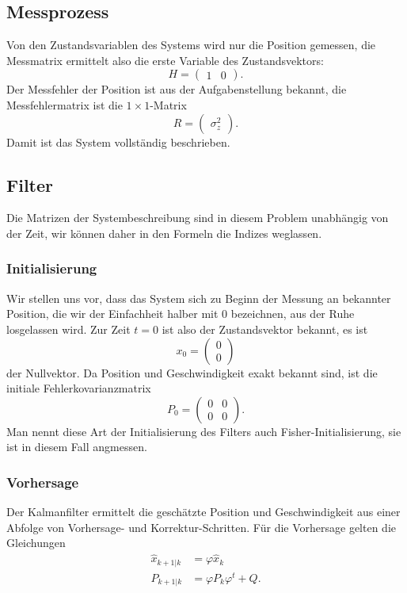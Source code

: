 \subsection{Messprozess}
Von den Zustandsvariablen des Systems wird nur die Position gemessen,
die Messmatrix ermittelt also die erste Variable des Zustandsvektors:
\[
H=\begin{pmatrix}1&0\end{pmatrix}.
\]
Der Messfehler der Position ist aus der Aufgabenstellung bekannt, die
Messfehlermatrix ist die $1\times 1$-Matrix
\[
R=\begin{pmatrix}
\sigma_z^2
\end{pmatrix}.
\]
Damit ist das System vollständig beschrieben.

\subsection{Filter}
Die Matrizen der Systembeschreibung sind in diesem Problem unabhängig
von der Zeit, wir können daher in den Formeln die Indizes weglassen.

\subsubsection{Initialisierung}
Wir stellen uns vor, dass das System sich zu Beginn der Messung an
bekannter Position, die wir der Einfachheit halber mit $0$ bezeichnen,
aus der Ruhe losgelassen wird.
Zur Zeit $t=0$ ist also der Zustandsvektor bekannt, es ist 
\[
x_0=\begin{pmatrix}0\\0\end{pmatrix}
\]
der Nullvektor.
Da Position und Geschwindigkeit exakt bekannt sind, ist die initiale
Fehlerkovarianzmatrix
\[
P_0=\begin{pmatrix}0&0\\0&0\end{pmatrix}.
\]
Man nennt diese Art der Initialisierung des Filters auch
Fisher-Initialisierung, sie ist in diesem Fall angmessen.

\subsubsection{Vorhersage}
Der Kalmanfilter ermittelt die geschätzte Position und Geschwindigkeit aus
einer Abfolge von Vorhersage- und Korrektur-Schritten.
Für die Vorhersage gelten die Gleichungen
\begin{align*}
\hat x_{k+1|k}&=\varphi \hat x_k\\
P_{k+1|k}&=\varphi P_k\varphi^t + Q.
\end{align*}


